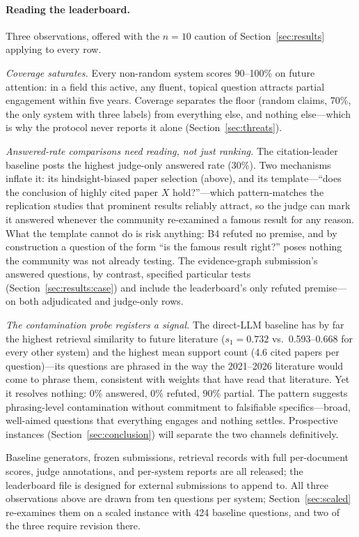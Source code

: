 \paragraph{Reading the leaderboard.} Three observations, offered with
the $n=10$ caution of Section~\ref{sec:results} applying to every row.

\emph{Coverage saturates.} Every non-random system scores 90--100\% on
future attention: in a field this active, any fluent, topical question
attracts partial engagement within five years. Coverage separates the
floor (random claims, 70\%, the only system with three
 labels) from everything else, and nothing
else---which is why the protocol never reports it alone
(Section~\ref{sec:threats}).

\emph{Answered-rate comparisons need reading, not just ranking.} The
citation-leader baseline posts the highest judge-only answered rate
(30\%). Two mechanisms inflate it: its hindsight-biased paper selection
(above), and its template---``does the conclusion of highly cited paper
$X$ hold?''---which pattern-matches the replication studies that
prominent results reliably attract, so the judge can mark it answered
whenever the community re-examined a famous result for any reason. What
the template cannot do is risk anything: B4 refuted no premise, and by
construction a question of the form ``is the famous result right?''
poses nothing the community was not already testing. The evidence-graph
submission's answered questions, by contrast, specified particular
tests (Section~\ref{sec:results:case}) and include the leaderboard's
only refuted premise---on both adjudicated and judge-only rows.

\emph{The contamination probe registers a signal.} The direct-LLM
baseline has by far the highest retrieval similarity to future
literature ($s_1 = 0.732$ vs.\ 0.593--0.668 for every other system) and
the highest mean support count (4.6 cited papers per question)---its
questions are phrased in the way the 2021--2026 literature would come
to phrase them, consistent with weights that have read that literature.
Yet it resolves nothing: 0\% answered, 0\% refuted, 90\% partial. The
pattern suggests phrasing-level contamination without commitment to
falsifiable specifics---broad, well-aimed questions that everything
engages and nothing settles. Prospective instances
(Section~\ref{sec:conclusion}) will separate the two channels
definitively.

Baseline generators, frozen submissions, retrieval records with full
per-document scores, judge annotations, and per-system reports are all
released; the leaderboard file is designed for external submissions to
append to. All three observations above are drawn from ten questions
per system; Section~\ref{sec:scaled} re-examines them on a scaled
instance with 424 baseline questions, and two of the three require
revision there.
